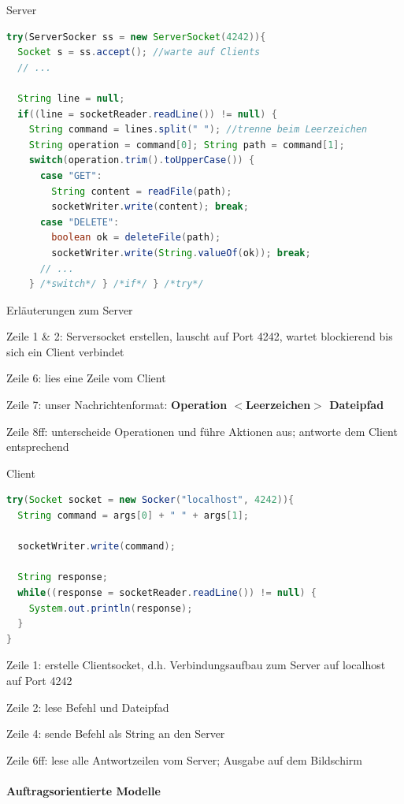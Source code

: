 \documentclass[10pt]{article}
\begin{document}
Server
\begin{lstlisting}[language=java]
try(ServerSocker ss = new ServerSocket(4242)){
  Socket s = ss.accept(); //warte auf Clients
  // ...

  String line = null;
  if((line = socketReader.readLine()) != null) {
    String command = lines.split(" "); //trenne beim Leerzeichen
    String operation = command[0]; String path = command[1];
    switch(operation.trim().toUpperCase()) {
      case "GET":
        String content = readFile(path);
        socketWriter.write(content); break;
      case "DELETE":
        boolean ok = deleteFile(path);
        socketWriter.write(String.valueOf(ok)); break;
      // ...
    } /*switch*/ } /*if*/ } /*try*/
\end{lstlisting}
Erläuterungen zum Server
\begin{itemize*}
  \item Zeile 1 \& 2: Serversocket erstellen, lauscht auf Port 4242, wartet blockierend bis sich ein Client verbindet
  \item Zeile 6: lies eine Zeile vom Client
  \item Zeile 7: unser Nachrichtenformat: \textbf{Operation $<$Leerzeichen$>$ Dateipfad}
  \item Zeile 8ff: unterscheide Operationen und führe Aktionen aus; antworte dem Client entsprechend
\end{itemize*}

Client
\begin{lstlisting}[language=java]
try(Socket socket = new Socker("localhost", 4242)){
  String command = args[0] + " " + args[1];

  socketWriter.write(command);

  String response;
  while((response = socketReader.readLine()) != null) {
    System.out.println(response);
  }
}
\end{lstlisting}
\begin{itemize*}
  \item Zeile 1: erstelle Clientsocket, d.h. Verbindungsaufbau zum Server auf localhost auf Port 4242
  \item Zeile 2: lese Befehl und Dateipfad
  \item Zeile 4: sende Befehl als String an den Server
  \item Zeile 6ff: lese alle Antwortzeilen vom Server; Ausgabe auf dem Bildschirm
\end{itemize*}

\paragraph{Auftragsorientierte Modelle}
\end{document}
